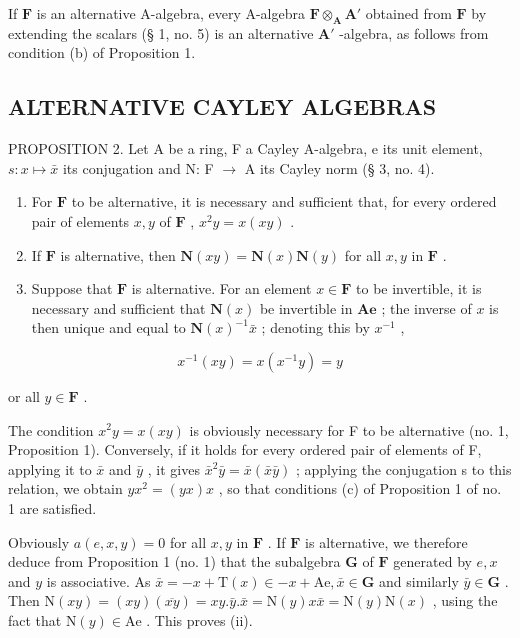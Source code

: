 If \(\mathbf{F}\) is an alternative A-algebra, every A-algebra \(\mathbf{F} \otimes_{\mathbf{A}} \mathbf{A}'\) obtained from \(\mathbf{F}\) by extending the scalars (§ 1, no. 5) is an alternative \(\mathbf{A}'\) -algebra, as follows from condition (b) of Proposition 1.

\subsection{ALTERNATIVE CAYLEY ALGEBRAS}

PROPOSITION 2. Let A be a ring, F a Cayley A-algebra, e its unit element, \(s: x \mapsto \bar{x}\) its conjugation and N: F \(\to\) A its Cayley norm (§ 3, no. 4).

\begin{enumerate}
\def\labelenumi{(\roman{enumi})}
\item
  For \(\mathbf{F}\) to be alternative, it is necessary and sufficient that, for every ordered pair of elements \(x, y\) of \(\mathbf{F}\) , \(x^2y = x(xy)\) .
\item
  If \(\mathbf{F}\) is alternative, then \(\mathbf{N}(xy) = \mathbf{N}(x)\mathbf{N}(y)\) for all \(x,y\) in \(\mathbf{F}\) .
\item
  Suppose that \(\mathbf{F}\) is alternative. For an element \(x \in \mathbf{F}\) to be invertible, it is necessary and sufficient that \(\mathbf{N}(x)\) be invertible in \(\mathbf{Ae}\) ; the inverse of \(x\) is then unique and equal to \(\mathbf{N}(x)^{-1}\bar{x}\) ; denoting this by \(x^{-1}\) ,
\end{enumerate}

\[
x ^ {- 1} (x y) = x \left(x ^ {- 1} y\right) = y
\]

or all \(y \in \mathbf{F}\) .

The condition \(x^{2}y = x(xy)\) is obviously necessary for F to be alternative (no. 1, Proposition 1). Conversely, if it holds for every ordered pair of elements of F, applying it to \(\bar{x}\) and \(\bar{y}\) , it gives \(\bar{x}^{2}\bar{y} = \bar{x}(\bar{x}\bar{y})\) ; applying the conjugation s to this relation, we obtain \(yx^{2} = (yx)x\) , so that conditions (c) of Proposition 1 of no. 1 are satisfied.

Obviously \(a(e, x, y) = 0\) for all \(x, y\) in \(\mathbf{F}\) . If \(\mathbf{F}\) is alternative, we therefore deduce from Proposition 1 (no. 1) that the subalgebra \(\mathbf{G}\) of \(\mathbf{F}\) generated by \(e, x\) and \(y\) is associative. As \(\bar{x} = -x + \mathrm{T}(x) \in -x + \mathrm{Ae}, \bar{x} \in \mathbf{G}\) and similarly \(\bar{y} \in \mathbf{G}\) . Then \(\mathrm{N}(xy) = (xy)(\overline{xy}) = xy.\bar{y}.\bar{x} = \mathrm{N}(y)x\bar{x} = \mathrm{N}(y)\mathrm{N}(x)\) , using the fact that \(\mathrm{N}(y) \in \mathrm{Ae}\) . This proves (ii).

